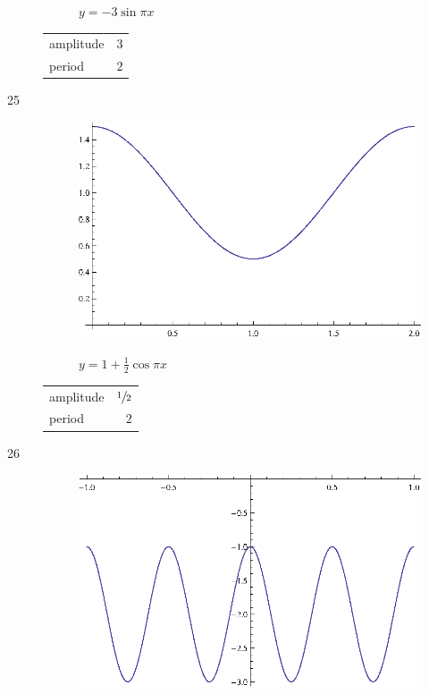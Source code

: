 \documentclass{exam}
\begin{document}
\begin{description}
\begin{figure}[H]
          $y = -3 \sin \pi x$
        \end{figure}

        \begin{tabular}[H]{lr}
          \toprule
          amplitude & $3$ \\
          period    & $2$ \\
          \bottomrule
        \end{tabular}

      \item[25]
        \begin{figure}[H]
          \centering
          \includegraphics[scale=0.9]{exercise25.eps}

          $y = 1 + \frac{1}{2} \cos \pi x$
        \end{figure}

        \begin{tabular}[H]{lr}
          \toprule
          amplitude & $\sfrac{1}{2}$ \\
          period    & $2$ \\
          \bottomrule
        \end{tabular}

      \item[26]
        \begin{figure}[H]
          \centering
          \includegraphics[scale=0.9]{exercise26.eps}


\end{figure}
\end{description}
\end{document}
